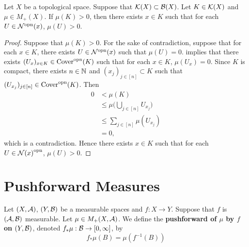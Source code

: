 \documentclass{book}
\begin{document}
\begin{ex} 
	Let $X$ be a topological space. Suppose that $\mathcal{K}(X) \subset \mathcal{B}(X)$. Let $K \in \mathcal{K}(X)$ and $\mu \in M_+(X)$. If $\mu(K) > 0$, then there exists $x \in K$ such that for each $U \in {\mathcal{N}}^{\text{opn}}(x)$, $\mu(U) > 0$.
\end{ex}

\begin{proof}
	Suppose that $\mu(K) > 0$. For the sake of contradiction, suppose that for each $x \in K$, there exists $U \in {\mathcal{N}}^{\text{opn}}(x)$ such that $\mu(U) = 0$.  implies that there exists $(U_x)_{x \in K} \in {\text{Cover}}^{\text{opn}}(K)$ such that for each $x \in K$, $\mu(U_x) = 0$. Since $K$ is compact, there exists $n \in \mathbb{N}$ and $(x_j)_{j \in [n]} \subset K$ such that $(U_{x_j})_{j \in [n]} \in {\text{Cover}}^{\text{opn}}(K)$. Then
	\begin{align*}
		0 
		& < \mu(K) \\
		& \leq \mu \bigg( \bigcup\limits_{j \in [n]} U_{x_j} \bigg) \\
		& \leq \sum\limits_{j \in [n]} \mu(U_{x_j}) \\
		& = 0,
	\end{align*}
	which is a contradiction. Hence there exists $x \in K$ such that for each $U \in {\mathcal{N}(x)}^{\text{opn}}$, $\mu(U) > 0$. 
\end{proof}






































\newpage
\section{Pushforward Measures}

\begin{defn} 
	Let $(X, \mathcal{A})$, $(Y, \mathcal{B})$ be a measurable spaces and $f: X \rightarrow Y$. Suppose that $f$ is $(\mathcal{A}, \mathcal{B})$ measurable. Let $\mu \in M_+(X, \mathcal{A})$. We define the \textbf{pushforward of $\mu$ by $f$ on $(Y, \mathcal{B})$}, denoted $f_*\mu: \mathcal{B} \rightarrow [0, \infty]$, by 
	$$f_*\mu(B) = \mu(f^{-1}(B))$$
\end{defn}
\end{document}
